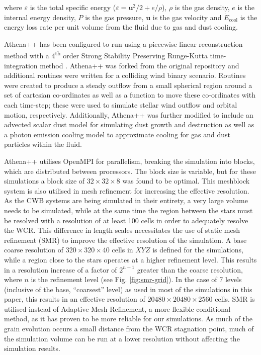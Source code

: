 \documentclass[fleqn,usenatbib]{mnras}
\newcommand{\ts}{\textsuperscript}
\newcommand{\rms}[1]{\ensuremath{_{\text{#1}}}}
\begin{document}
\noindent
where $\varepsilon$ is the total specific energy ($\varepsilon = \boldsymbol{u}^2/2 + e/\rho $), $\rho$ is the gas density, $e$ is the internal energy density, $P$ is the gas pressure, $\boldsymbol{u}$ is the gas velocity and $\dot E\rms{cool}$ is the energy loss rate per unit volume from the fluid due to gas and dust cooling.


Athena++ has been configured to run using a piecewise linear reconstruction method with a 4\ts{th} order Strong Stability Preserving Runge-Kutta time-integration method \citep{spiteriNewClassOptimal2002}.
Athena++ was forked from the original repository and additional routines were written for a colliding wind binary scenario.
Routines were created to produce a steady outflow from a small spherical region around a set of cartesian co-ordinates as well as a function to move these co-ordinates with each time-step; these were used to simulate stellar wind outflow and orbital motion, respectively.
Additionally, Athena++ was further modified to include an advected scalar dust model for simulating dust growth and destruction as well as a photon emission cooling model to approximate cooling for gas and dust particles within the fluid.

Athena++ utilises OpenMPI for parallelism, breaking the simulation into blocks, which are distributed between processors.
The block size is variable, but for these simulations a block size of $32\times 32 \times 8$ was found to be optimal.
This meshblock system is also utilised in mesh refinement for increasing the effective resolution.
As the CWB systems are being simulated in their entirety, a very large volume needs to be simulated, while at the same time the region between the stars must be resolved with a resolution of at least 100 cells in order to adequately resolve the WCR.
This difference in length scales necessitates the use of static mesh refinement (SMR) to improve the effective resolution of the simulation.
A base coarse resolution of $320 \times 320 \times 40$ cells in $XYZ$ is defined for the simulations, while a region close to the stars operates at a higher refinement level.
This results in a resolution increase of a factor of $2^{n-1}$ greater than the coarse resolution, where $n$ is the refinement level (see Fig. \ref{fig:smr-grid}).
In the case of 7 levels (inclusive of the base, ``coarsest'' level) as used in most of the simulations in this paper, this results in an effective resolution of $20480 \times 20480 \times 2560$ cells.
SMR is utilised instead of Adaptive Mesh Refinement, a more flexible conditional method, as it has proven to be more reliable for our simulations.
As much of the grain evolution occurs a small distance from the WCR stagnation point, much of the simulation volume can be run at a lower resolution without affecting the simulation results.
\end{document}
